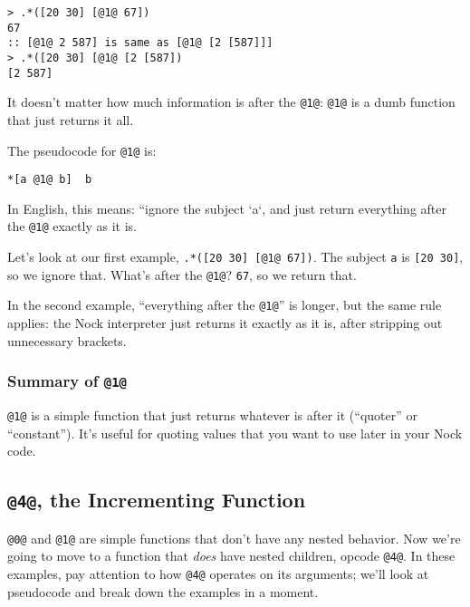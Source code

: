 \documentclass[twoside]{article}
\begin{document}
\begin{lstlisting}[style=listingcode]
> .*([20 30] [@1@ 67])
67
:: [@1@ 2 587] is same as [@1@ [2 [587]]]
> .*([20 30] [@1@ [2 [587])
[2 587]
\end{lstlisting}

It doesn't matter how much information is after the \lstinline[style=inlinecode]{@1@}: \lstinline[style=inlinecode]{@1@} is a dumb function that just returns it all.

The pseudocode for \lstinline[style=inlinecode]{@1@} is:

\begin{lstlisting}[style=listingcode]
*[a @1@ b]  b
\end{lstlisting}

In English, this means: ``ignore the subject `a`, and just return everything after the \lstinline[style=inlinecode]{@1@} exactly as it is.

Let's look at our first example, \lstinline[style=inlinecode]{.*([20 30] [@1@ 67])}. The subject \lstinline[style=inlinecode]{a} is \lstinline[style=inlinecode]{[20 30]}, so we ignore that. What's after the \lstinline[style=inlinecode]{@1@}? \lstinline[style=inlinecode]{67}, so we return that.

In the second example, “everything after the \lstinline[style=inlinecode]{@1@}” is longer, but the same rule applies: the Nock interpreter just returns it exactly as it is, after stripping out unnecessary brackets.

\subsubsection{Summary of \lstinline[style=inlinecode]{@1@}}

\lstinline[style=inlinecode]{@1@} is a simple function that just returns whatever is after it (“quoter” or “constant”). It's useful for quoting values that you want to use later in your Nock code.

\subsection{\lstinline[style=inlinecode]{@4@}, the Incrementing Function}
\label{sxn:nock4}

\lstinline[style=inlinecode]{@0@} and \lstinline[style=inlinecode]{@1@} are simple functions that don't have any nested behavior. Now we're going to move to a function that \emph{does} have nested children, opcode \lstinline[style=inlinecode]{@4@}.  In these examples, pay attention to how \lstinline[style=inlinecode]{@4@} operates on its arguments; we'll look at pseudocode and break down the examples in a moment.
\end{document}
